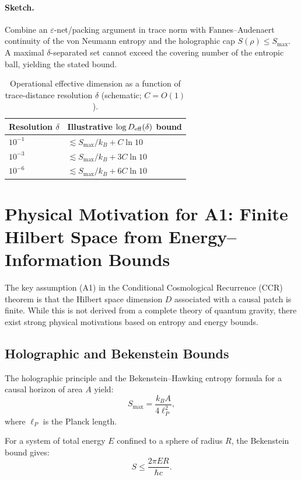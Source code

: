 \documentclass[12pt]{article}
\newcommand{\Smax}{S_{\max}}
\theoremstyle{remark}
\begin{document}
\paragraph{Sketch.} Combine an $\varepsilon$-net/packing argument in trace norm with Fannes--Audenaert continuity of the von Neumann entropy and the holographic cap $S(\rho)\le \Smax$. A maximal $\delta$-separated set cannot exceed the covering number of the entropic ball, yielding the stated bound.

\begin{table}[H]
  \centering
  \begin{tabular}{l l}
    \hline
    Resolution $\delta$ & Illustrative $\log D_{\rm eff}(\delta)$ bound \\
    \hline
    $10^{-1}$ & $\lesssim \Smax/k_B + C\ln 10$ \\
    $10^{-3}$ & $\lesssim \Smax/k_B + 3C\ln 10$ \\
    $10^{-6}$ & $\lesssim \Smax/k_B + 6C\ln 10$ \\
    \hline
  \end{tabular}
  \caption{Operational effective dimension as a function of trace-distance resolution $\delta$ (schematic; $C=O(1)$).}
  \label{tab:Deff}
\end{table}


\section{Physical Motivation for A1: Finite Hilbert Space from Energy--Information Bounds}
\label{sec:motivation_A1}

The key assumption (A1) in the Conditional Cosmological Recurrence (CCR) theorem is that the Hilbert space dimension \(D\) associated with a causal patch is finite. While this is not derived from a complete theory of quantum gravity, there exist strong physical motivations based on entropy and energy bounds.

\subsection{Holographic and Bekenstein Bounds}
The holographic principle and the Bekenstein--Hawking entropy formula for a causal horizon of area \(A\) yield:
\begin{equation}
\Smax = \frac{k_B A}{4 \ell_P^2},
\end{equation}
where \(\ell_P\) is the Planck length.

For a system of total energy \(E\) confined to a sphere of radius \(R\), the Bekenstein bound gives:
\begin{equation}
S \le \frac{2\pi E R}{\hbar c}.
\end{equation}
\end{document}
